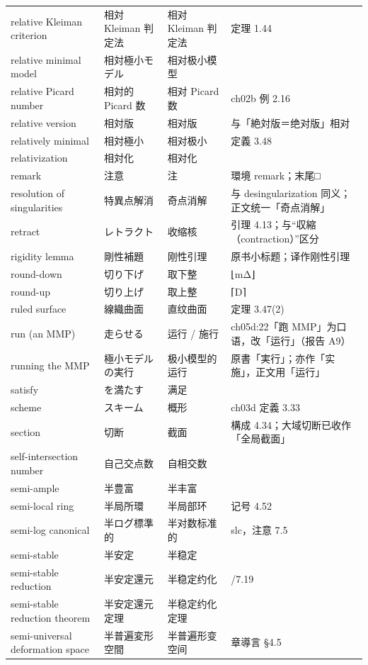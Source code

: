 \begin{longtable}{@{}>{\raggedright\arraybackslash}p{}>{\raggedright\arraybackslash}p{}>{\raggedright\arraybackslash}p{}>{\raggedright\arraybackslash}p{}@{}}
relative Kleiman criterion & 相対 Kleiman 判定法 & 相对 Kleiman 判定法 & 定理 1.44 \\
relative minimal model & 相対極小モデル & 相对极小模型 &  \\
relative Picard number & 相対的 Picard 数 & 相对 Picard 数 & ch02b 例 2.16 \\
relative version & 相対版 & 相对版 & 与「絶対版＝绝对版」相对 \\
relatively minimal & 相対極小 & 相对极小 & 定義 3.48 \\
relativization & 相対化 & 相对化 &  \\
remark & 注意 & 注 & 環境 remark；末尾□ \\
resolution of singularities & 特異点解消 & 奇点消解 & 与 desingularization 同义；正文统一「奇点消解」 \\
retract & レトラクト & 收缩核 & 引理 4.13；与“収縮（contraction）”区分 \\
rigidity lemma & 剛性補題 & 刚性引理 & 原书小标题；译作刚性引理 \\
round-down & 切り下げ & 取下整 & ⌊mΔ⌋ \\
round-up & 切り上げ & 取上整 & ⌈D⌉ \\
ruled surface & 線織曲面 & 直纹曲面 & 定理 3.47(2) \\
run (an MMP) & 走らせる & 运行 / 施行 & ch05d:22「跑 MMP」为口语，改「运行」（报告 A9） \\
running the MMP & 極小モデルの実行 & 极小模型的运行 & 原書「実行」；亦作「实施」，正文用「运行」 \\
satisfy & を満たす & 满足 &  \\
scheme & スキーム & 概形 & ch03d 定義 3.33 \\
section & 切断 & 截面 & 構成 4.34；大域切断已收作「全局截面」 \\
self-intersection number & 自己交点数 & 自相交数 &  \\
semi-ample & 半豊富 & 半丰富 &  \\
semi-local ring & 半局所環 & 半局部环 & 记号 4.52 \\
semi-log canonical & 半ログ標準的 & 半对数标准的 & slc，注意 7.5 \\
semi-stable & 半安定 & 半稳定 &  \\
semi-stable reduction & 半安定還元 & 半稳定约化 & 7.17/7.19 \\
semi-stable reduction theorem & 半安定還元定理 & 半稳定约化定理 &  \\
semi-universal deformation space & 半普遍変形空間 & 半普遍形变空间 & 章導言 §4.5 \\

\end{longtable}

